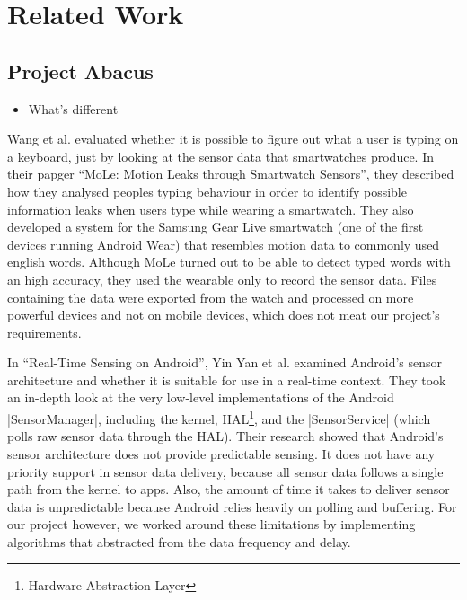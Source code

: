 \section{Related Work}
\label{sec:relatedwork}

\subsection{Project Abacus}
\begin{itemize}[noitemsep]
	\item What's different
\end{itemize}

Wang et al. evaluated whether it is possible to figure out what a user is typing on a keyboard, just by looking at the sensor data that smartwatches produce.
In their papger ``MoLe: Motion Leaks through Smartwatch Sensors''\cite{paper:motionleaks}, they described how they analysed peoples typing behaviour in order to identify possible information leaks when users type while wearing a smartwatch.
They also developed a system for the Samsung Gear Live smartwatch (one of the first devices running Android Wear) that resembles motion data to commonly used english words.
Although MoLe turned out to be able to detect typed words with an high accuracy, they used the wearable only to record the sensor data.
Files containing the data were exported from the watch and processed on more powerful devices and not on mobile devices, which does not meat our project's requirements.

In ``Real-Time Sensing on Android''\cite{paper:realtimesensing}, Yin Yan et al. examined Android’s sensor architecture and whether it is suitable for use in a real-time context.
They took an in-depth look at the very low-level implementations of the Android |SensorManager|\cite{androiddocs:sensormanager}, including the kernel, HAL\footnote{Hardware Abstraction Layer}, and the |SensorService| (which polls raw sensor data through the HAL).
Their research showed that Android's sensor architecture does not provide predictable sensing.
It does not have any priority support in sensor data delivery, because all sensor data follows a single path from the kernel to apps.
Also, the amount of time it takes to deliver sensor data is unpredictable because Android relies heavily on polling and buffering.
For our project however, we worked around these limitations by implementing algorithms that abstracted from the data frequency and delay.


\clearpage